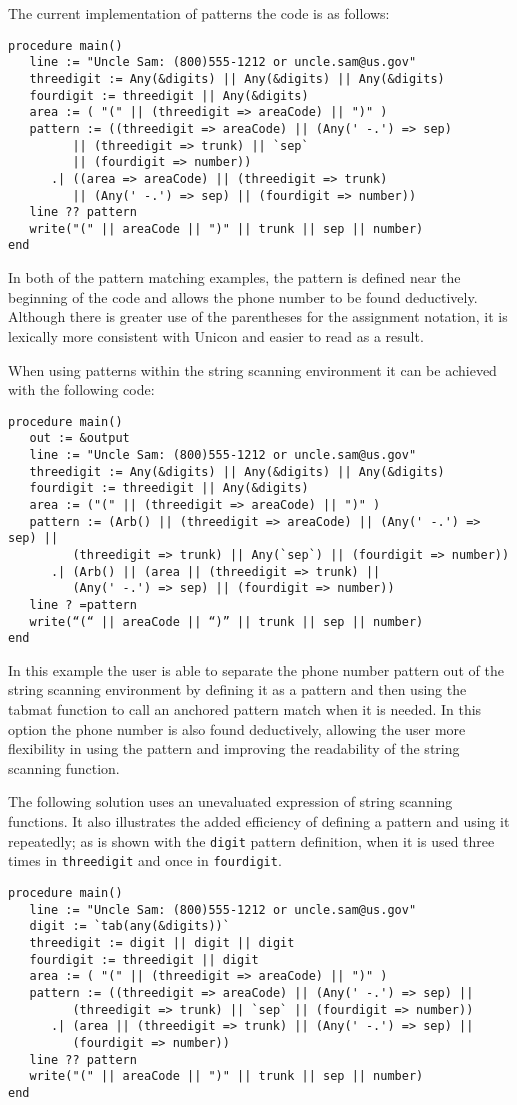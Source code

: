 \documentclass{article}
\begin{document}
The current implementation of patterns the code is as follows:
\begin{verbatim}
procedure main()
   line := "Uncle Sam: (800)555-1212 or uncle.sam@us.gov"
   threedigit := Any(&digits) || Any(&digits) || Any(&digits)
   fourdigit := threedigit || Any(&digits)
   area := ( "(" || (threedigit => areaCode) || ")" )
   pattern := ((threedigit => areaCode) || (Any(' -.') => sep) 
         || (threedigit => trunk) || `sep` 
         || (fourdigit => number))
      .| ((area => areaCode) || (threedigit => trunk) 
         || (Any(' -.') => sep) || (fourdigit => number))
   line ?? pattern
   write("(" || areaCode || ")" || trunk || sep || number) 
end
\end{verbatim}
In both of the pattern matching examples, the pattern is defined near the beginning of the code and allows the phone number to be found deductively. Although there is greater use of the parentheses for the assignment notation, it is lexically more consistent with Unicon and easier to read as a result.  

When using patterns within the string scanning environment it can be achieved with the following code:
\begin{verbatim}
procedure main()
   out := &output
   line := "Uncle Sam: (800)555-1212 or uncle.sam@us.gov"
   threedigit := Any(&digits) || Any(&digits) || Any(&digits)
   fourdigit := threedigit || Any(&digits)
   area := ("(" || (threedigit => areaCode) || ")" )
   pattern := (Arb() || (threedigit => areaCode) || (Any(' -.') => sep) || 
         (threedigit => trunk) || Any(`sep`) || (fourdigit => number)) 
      .| (Arb() || (area || (threedigit => trunk) || 
         (Any(' -.') => sep) || (fourdigit => number))
   line ? =pattern 
   write(“(“ || areaCode || “)” || trunk || sep || number)
end
\end{verbatim}
In this example the user is able to separate the phone number pattern out of the string scanning environment by defining it as a pattern and then using the tabmat function to call an anchored pattern match when it is needed.  In this option the phone number is also found deductively, allowing the user more flexibility in using the pattern and improving the readability of the string scanning function.

The following solution uses an unevaluated expression of string scanning functions.  It also illustrates the added efficiency of defining a pattern and using it repeatedly; as is shown with the \texttt{digit} pattern definition, when it is used three times in \texttt{threedigit} and once in \texttt{fourdigit}. 
\begin{verbatim}
procedure main()
   line := "Uncle Sam: (800)555-1212 or uncle.sam@us.gov"
   digit := `tab(any(&digits))`
   threedigit := digit || digit || digit
   fourdigit := threedigit || digit
   area := ( "(" || (threedigit => areaCode) || ")" )
   pattern := ((threedigit => areaCode) || (Any(' -.') => sep) ||
         (threedigit => trunk) || `sep` || (fourdigit => number)) 
      .| (area || (threedigit => trunk) || (Any(' -.') => sep) ||
         (fourdigit => number))
   line ?? pattern
   write("(" || areaCode || ")" || trunk || sep || number) 
end
\end{verbatim}
\end{document}
